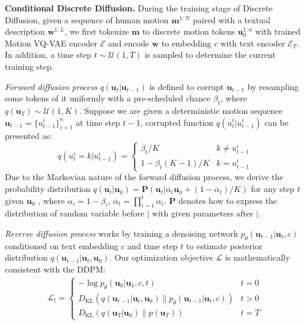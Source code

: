 \documentclass[letterpaper]{article} \usepackage{aaai24}
\begin{document}
\noindent\textbf{Conditional Discrete Diffusion.} During the training stage of Discrete Diffusion, given a sequence of human motion $\bm{m}^{1:N}$ paired with a textual description $\bm{w}^{1:L}$, we first tokenize $\bm{m}$ to discrete motion tokens $\bm{u}_0^{1:n}$ with trained Motion VQ-VAE encoder $\mathcal{E}$ and encode $\bm{w}$ to embedding $c$ with text encoder $\mathcal{E}_T$. In addition, a time step $t \sim \mathcal{U}(1,T)$ is sampled to determine the current training step.

\textit{Forward diffusion process} $ q(\bm{u}_t|\bm{u}_{t-1})$  is defined to corrupt $\bm{u}_{t-1}$ by resampling some tokens of it uniformly with a pre-scheduled chance $\beta_t$, where $q(\bm{u}_T) \sim \mathcal{U}(1,K)$. Suppose we are given a deterministic motion sequence $\bm{u}_{t-1} = \{u^i_{t-1}\}_{i=1}^{n}$ at time step $t-1$, corrupted function $q(u_t^i|u_{t-1}^i)$ can be presented as:
\begin{equation}
    q(u_t^i = k|u_{t-1}^i) = \label{eq:trans}
    \begin{cases}
        \beta_t / K & k \neq u^i_{t-1} \\
        1 - \beta_t(K-1)/K & k = u^i_{t-1}
    \end{cases}
\end{equation}
Due to the Markovian nature of the forward diffusion process, we derive the probability distribution $q(\bm{u}_t|\bm{u}_0)=\mathcal{\bm{P}}(\bm{u}_t|\overline{\alpha}_t\bm{u}_0+(1-\overline{\alpha}_t)/K)$ for any step $t$ given $\bm{u}_0$ 
, where $\alpha_i = 1 - \beta_i $, $ \overline{\alpha}_t = \prod_{i=1}^t \alpha_i$. $\mathcal{\bm{P}}$ denotes how to express the distribution of random variable before $|$ with given parameters after $|$.


\textit{Reverse diffusion process} works by training a denoising network $p_\theta(\bm{u}_{t-1}|\bm{u}_t, c)$ conditioned on text embedding $c$ and time step $t$ to estimate posterior distribution $q(\bm{u}_{t-1}|\bm{u}_t,\bm{u}_0)$. Our optimization objective $\mathcal{L}$ is mathematically consistent with the DDPM:
\begin{equation}
\begin{split}
\mathcal{L}_t = 
\begin{cases}
    -\log p_\theta(\bm{u}_0|\bm{u}_1, c, t) & t = 0 \\
    D_{\text{KL}}(q\left(\bm{u}_{t-1} | \bm{u}_t, \bm{u}_0\right) \| p_\theta\left(\bm{u}_{t-1} | \bm{u}_t, c\right)) & t>0 \\
    D_{\text{KL}}(q\left(\bm{u}_{T} | \bm{u}_0\right) \| p\left(\bm{u}_{T}\right)) & t=T  
\end{cases}
\end{split}
\end{equation}
\end{document}
